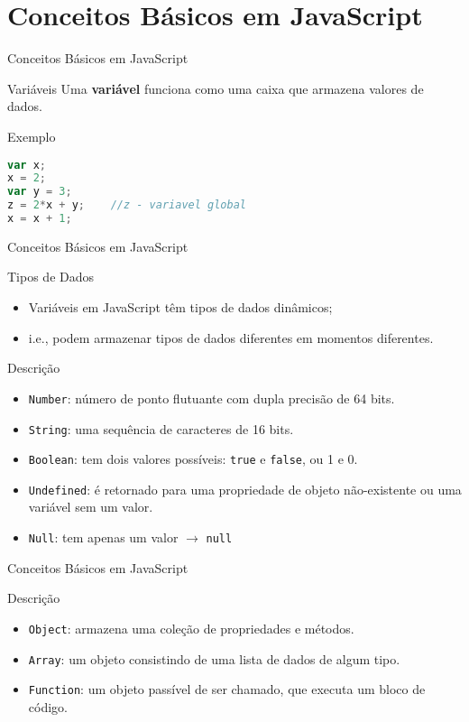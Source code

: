 \documentclass[xcolor=dvipsnames,table]{beamer}
\begin{document}
\section{Conceitos Básicos em JavaScript}
\begin{frame}[fragile]{Conceitos Básicos em JavaScript}
	\begin{block}{Variáveis}
		Uma {\bf variável} funciona como uma caixa que armazena valores de dados.
	\end{block} \pause
	\begin{block}{Exemplo}
		\begin{lstlisting}[language=JavaScript]
var x;
x = 2;
var y = 3;
z = 2*x + y;	//z - variavel global
x = x + 1;
\end{lstlisting}	
	\end{block}
\end{frame}

\begin{frame}[fragile]{Conceitos Básicos em JavaScript}
	\begin{block}{Tipos de Dados}
		\begin{itemize}
			\item Variáveis em JavaScript têm tipos de dados dinâmicos; \pause
			\item i.e., podem armazenar tipos de dados diferentes em momentos diferentes.
		\end{itemize}
	\end{block} \pause
	\begin{block}{Descrição}
		\begin{itemize}
			\item {\tt Number}: número de ponto flutuante com dupla precisão de 64 bits. \pause
			\item {\tt String}: uma sequência de caracteres de 16 bits. \pause
			\item {\tt Boolean}: tem dois valores possíveis: {\tt true} e {\tt false}, ou 1 e 0. \pause
			\item {\tt Undefined}: é retornado para uma propriedade de objeto não-existente ou uma variável sem um valor. \pause
			\item {\tt Null}: tem apenas um valor $\rightarrow$ {\tt null}
		\end{itemize}	
	\end{block}
\end{frame}


\begin{frame}[fragile]{Conceitos Básicos em JavaScript}
	\begin{block}{Descrição}
		\begin{itemize}
			\item {\tt Object}: armazena uma coleção de propriedades e métodos. \pause
			\item {\tt Array}: um objeto consistindo de uma lista de dados de algum tipo. \pause 
			\item {\tt Function}: um objeto passível de ser chamado, que executa um bloco de código. 
		\end{itemize}	
	\end{block}
\end{frame}
	
	\begin{frame}
		\titlepage
	\end{frame}
	
\end{document}

